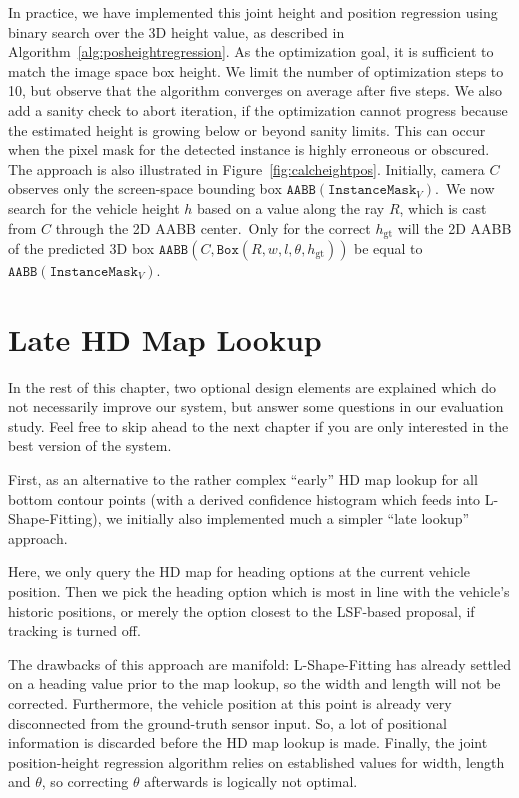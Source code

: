 In practice, we have implemented this joint height and position regression using binary search over the 3D height value, as described in Algorithm~\ref{alg:posheightregression}.
As the optimization goal, it is sufficient to match the image space box height.
We limit the number of optimization steps to 10, but observe that the algorithm converges on average after five steps.
We also add a sanity check to abort iteration, if the optimization cannot progress because the estimated height is growing below or beyond sanity limits.
This can occur when the pixel mask for the detected instance is highly erroneous or obscured.
The approach is also illustrated in Figure~\ref{fig:calcheightpos}.
Initially, camera $C$ observes only the screen-space bounding box $\mathtt{AABB}(\texttt{InstanceMask}_V)$.\ We now search for the vehicle height $h$ based on a value along the ray $R$, which is cast from $C$ through the 2D AABB center.\ Only for the correct $h_\text{gt}$ will the 2D AABB of the predicted 3D box $\mathtt{AABB}(C,\mathtt{Box}(R,w,l,\theta,h_\text{gt}))$ be equal to $\mathtt{AABB}(\texttt{InstanceMask}_V)$.


\section{Late HD Map Lookup}
\label{sec:hdmaplate}

In the rest of this chapter, two optional design elements are explained which do not necessarily improve our system, but answer some questions in our evaluation study.
Feel free to skip ahead to the next chapter if you are only interested in the best version of the system.

First, as an alternative to the rather complex \enquote{early} HD map lookup for all bottom contour points (with a derived confidence histogram which feeds into L-Shape-Fitting), we initially also implemented much a simpler \enquote{late lookup} approach.

Here, we only query the HD map for heading options at the current vehicle position.
Then we pick the heading option which is most in line with the vehicle's historic positions, or merely the option closest to the LSF-based proposal, if tracking is turned off.

The drawbacks of this approach are manifold: L-Shape-Fitting has already settled on a heading value prior to the map lookup, so the width and length will not be corrected.
Furthermore, the vehicle position at this point is already very disconnected from the ground-truth sensor input.
So, a lot of positional information is discarded before the HD map lookup is made.
Finally, the joint position-height regression algorithm relies on established values for width, length and $\theta$, so correcting $\theta$ afterwards is logically not optimal.

